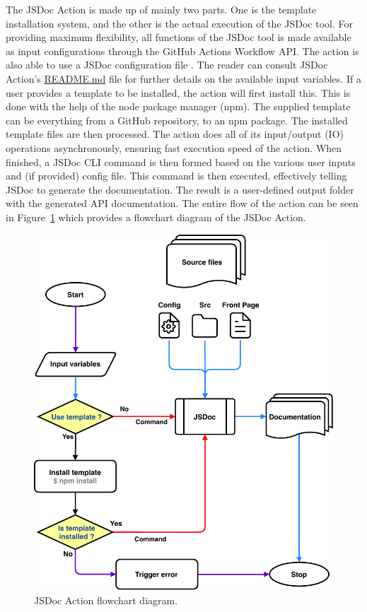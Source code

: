 The JSDoc Action is made up of mainly two parts. One is the template installation system, and the other is the actual execution of the JSDoc tool. For providing maximum flexibility, all functions of the JSDoc tool is made available as input configurations through the GitHub Actions Workflow API. The action is also able to use a JSDoc configuration file \cite{jsdoc-config-file}. The reader can consult JSDoc Action's \href{https://github.com/andstor/jsdoc-action/blob/master/README.md}{README.md} file for further details on the available input variables. If a user provides a template to be installed, the action will first install this. This is done with the help of the node package manager (npm). The supplied template can be everything from a GitHub repository, to an npm package. The installed template files are then processed. The action does all of its input/output (IO) operations asynchronously, ensuring fast execution speed of the action. When finished, a JSDoc CLI command is then formed based on the various user inputs and (if provided) config file. This command is then executed, effectively telling JSDoc to generate the documentation. The result is a user-defined output folder with the generated API documentation. The entire flow of the action can be seen in Figure~\ref{fig:jsdoc-action-flowchart} which provides a flowchart diagram of the JSDoc Action.
\begin{figure}[htp]
    \centering
    \includegraphics[scale=1]{sections/methodology/figures/jsdoc-action-flowchart.pdf}
    \caption{JSDoc Action flowchart diagram.}
    \label{fig:jsdoc-action-flowchart}
\end{figure}

